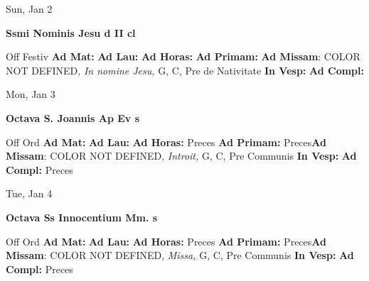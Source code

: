 \documentclass[10pt]{memoir}
\begin{document}
\begin{center}
\begin{minipage}{3.5in}
\vspace{2em}
\begin{center}Sun, Jan 2
\end{center}
\textbf{ \large Ssmi Nominis Jesu
\textnormal{\normalsize d II cl}}

\begin{justify}Off Festiv
\textbf{Ad Mat: }
\textbf{Ad Lau: }
\textbf{Ad Horas: }
\textbf{Ad Primam: }\textbf{Ad Missam}: COLOR NOT DEFINED, \textit{In nomine Jesu,} G, C, Pre de Nativitate
\textbf{In Vesp: }
\textbf{Ad Compl: }
\end{justify}
\end{minipage}
\end{center}

\begin{center}
\begin{minipage}{3.5in}
\vspace{2em}
\begin{center}Mon, Jan 3
\end{center}
\textbf{ \large Octava S. Joannis Ap Ev
\textnormal{\normalsize s}}

\begin{justify}Off Ord
\textbf{Ad Mat: }
\textbf{Ad Lau: }
\textbf{Ad Horas: }Preces
\textbf{Ad Primam: }Preces\textbf{Ad Missam}: COLOR NOT DEFINED, \textit{Introit,} G, C, Pre Communis
\textbf{In Vesp: }
\textbf{Ad Compl: }Preces
\end{justify}
\end{minipage}
\end{center}

\begin{center}
\begin{minipage}{3.5in}
\vspace{2em}
\begin{center}Tue, Jan 4
\end{center}
\textbf{ \large Octava Ss Innocentium Mm.
\textnormal{\normalsize s}}

\begin{justify}Off Ord
\textbf{Ad Mat: }
\textbf{Ad Lau: }
\textbf{Ad Horas: }Preces
\textbf{Ad Primam: }Preces\textbf{Ad Missam}: COLOR NOT DEFINED, \textit{Missa,} G, C, Pre Communis
\textbf{In Vesp: }
\textbf{Ad Compl: }Preces
\end{justify}
\end{minipage}
\end{center}
\end{document}
